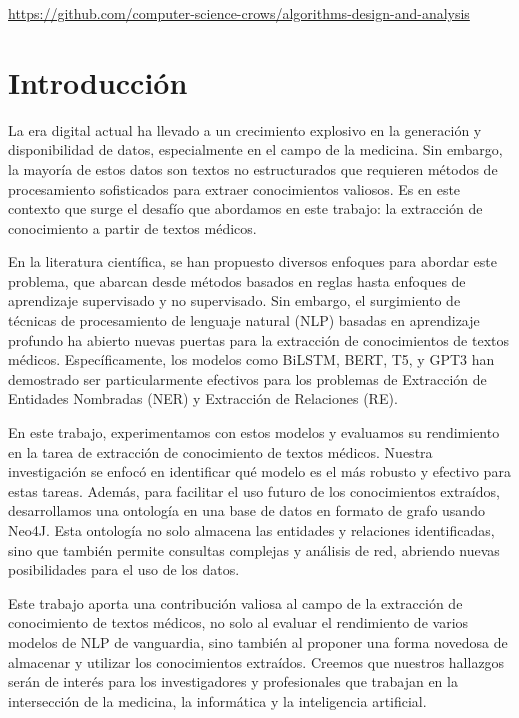 \documentclass[10pt]{article} %
\begin{document}
	\begin{center}
		\href{https://github.com/computer-science-crows/algorithms-design-and-analysis}{https://github.com/computer-science-crows/algorithms-design-and-analysis}
	\end{center}

	\section{Introducci\'on}
	
	La era digital actual ha llevado a un crecimiento explosivo en la generación y disponibilidad de datos, especialmente en el campo de la medicina. Sin embargo, la mayoría de estos datos son textos no estructurados que requieren métodos de procesamiento sofisticados para extraer conocimientos valiosos. Es en este contexto que surge el desafío que abordamos en este trabajo: la extracción de conocimiento a partir de textos médicos.
	
	En la literatura científica, se han propuesto diversos enfoques para abordar este problema, que abarcan desde métodos basados en reglas hasta enfoques de aprendizaje supervisado y no supervisado. Sin embargo, el surgimiento de técnicas de procesamiento de lenguaje natural (NLP) basadas en aprendizaje profundo ha abierto nuevas puertas para la extracción de conocimientos de textos médicos.  Específicamente, los modelos como BiLSTM, BERT, T5, y GPT3 han demostrado ser particularmente efectivos para los problemas de Extracción de Entidades Nombradas (NER) y Extracción de Relaciones (RE). 
	
	En este trabajo, experimentamos con estos modelos y evaluamos su rendimiento en la tarea de extracción de conocimiento de textos médicos. Nuestra investigación se enfocó en identificar qué modelo es el más robusto y efectivo para estas tareas. Además, para facilitar el uso futuro de los conocimientos extraídos, desarrollamos una ontología en una base de datos en formato de grafo usando Neo4J. Esta ontología no solo almacena las entidades y relaciones identificadas, sino que también permite consultas complejas y análisis de red, abriendo nuevas posibilidades para el uso de los datos.
	
	Este trabajo aporta una contribución valiosa al campo de la extracción de conocimiento de textos médicos, no solo al evaluar el rendimiento de varios modelos de NLP de vanguardia, sino también al proponer una forma novedosa de almacenar y utilizar los conocimientos extraídos. Creemos que nuestros hallazgos serán de interés para los investigadores y profesionales que trabajan en la intersección de la medicina, la informática y la inteligencia artificial.
	
\end{document}

